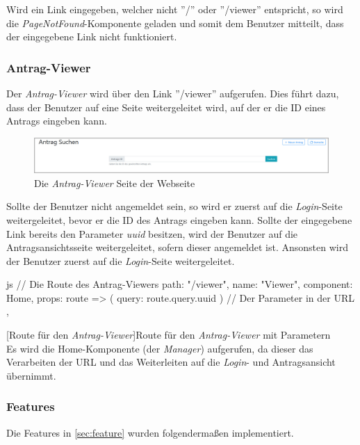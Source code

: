 Wird ein Link eingegeben, welcher nicht ''/'' oder ''/viewer'' entspricht, so wird die \textit{PageNotFound}-Komponente geladen und somit dem Benutzer mitteilt, dass der eingegebene Link nicht funktioniert.
\subsubsection{Antrag-Viewer}
\label{sec:antrag_viewer}
Der \textit{Antrag-Viewer} wird über den Link ''/viewer'' aufgerufen. Dies führt dazu, dass der Benutzer auf eine Seite weitergeleitet wird, auf der er die ID eines Antrags eingeben kann.
\begin{figure}[H]
	\centering
	\includegraphics[width=1\linewidth]{images/rfoster_implementierung/antrag_viewer}
	\caption[Webseite \textit{Antrag-Viewer}]{Die \textit{Antrag-Viewer} Seite der Webseite}
	\label{fig:antragviewer}
\end{figure}

Sollte der Benutzer nicht angemeldet sein, so wird er zuerst auf die \textit{Login}-Seite weitergeleitet, bevor er die ID des Antrags eingeben kann. Sollte der eingegebene Link bereits den Parameter \textit{uuid} besitzen, wird der Benutzer auf die Antragsansichtsseite weitergeleitet, sofern dieser angemeldet ist. Ansonsten wird der Benutzer zuerst auf die \textit{Login}-Seite weitergeleitet.
\begin{code}{js}
	{
		// Die Route des Antrag-Viewers
		path: "/viewer",
		name: "Viewer",
		component: Home,
		props: route => ({ query: route.query.uuid }) // Der Parameter in der URL
	},
\end{code}
[Route für den \textit{Antrag-Viewer}]{Route für den \textit{Antrag-Viewer} mit Parametern}~\\
Es wird die Home-Komponente (der \textit{Manager}) aufgerufen, da dieser das Verarbeiten der URL und das Weiterleiten auf die \textit{Login}- und Antragsansicht übernimmt.
\newpage
\subsubsection{Features}
Die Features in \autoref{sec:feature} wurden folgendermaßen implementiert.

